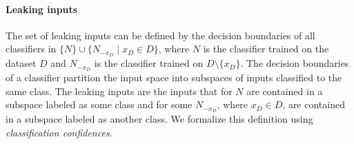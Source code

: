 \paragraph{Leaking inputs}
The set of leaking inputs can be defined by the decision boundaries of all classifiers in $\{N\}\cup \{N_{-x_D}\mid x_D \in D\}$, where $N$ is the classifier trained on the dataset $D$ and $N_{-x_D}$ is the classifier trained on $D\setminus\{x_D\}$.  
The decision boundaries of a classifier partition the input space into subspaces of inputs classified to the same class. %
The leaking inputs are the inputs that for $N$ are contained in a subspace labeled as some class and 
for some $N_{-x_D}$, where $x_D \in D$, are contained in a subspace labeled as another class.
We formalize this definition using \emph{classification confidences}. %
%
